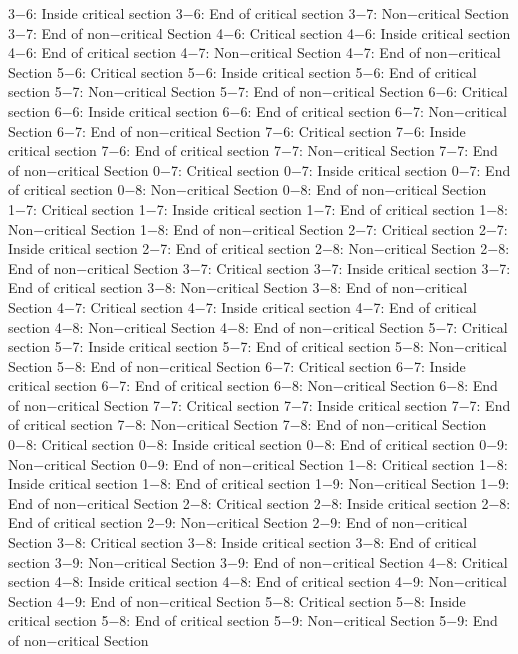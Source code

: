 3−6: Inside critical section
3−6: End of critical section
3−7: Non−critical Section
3−7: End of non−critical Section
4−6: Critical section
4−6: Inside critical section
4−6: End of critical section
4−7: Non−critical Section
4−7: End of non−critical Section
5−6: Critical section
5−6: Inside critical section
5−6: End of critical section
5−7: Non−critical Section
5−7: End of non−critical Section
6−6: Critical section
6−6: Inside critical section
6−6: End of critical section
6−7: Non−critical Section
6−7: End of non−critical Section
7−6: Critical section
7−6: Inside critical section
7−6: End of critical section
7−7: Non−critical Section
7−7: End of non−critical Section
0−7: Critical section
0−7: Inside critical section
0−7: End of critical section
0−8: Non−critical Section
0−8: End of non−critical Section
1−7: Critical section
1−7: Inside critical section
1−7: End of critical section
1−8: Non−critical Section
1−8: End of non−critical Section
2−7: Critical section
2−7: Inside critical section
2−7: End of critical section
2−8: Non−critical Section
2−8: End of non−critical Section
3−7: Critical section
3−7: Inside critical section
3−7: End of critical section
3−8: Non−critical Section
3−8: End of non−critical Section
4−7: Critical section
4−7: Inside critical section
4−7: End of critical section
4−8: Non−critical Section
4−8: End of non−critical Section
5−7: Critical section
5−7: Inside critical section
5−7: End of critical section
5−8: Non−critical Section
5−8: End of non−critical Section
6−7: Critical section
6−7: Inside critical section
6−7: End of critical section
6−8: Non−critical Section
6−8: End of non−critical Section
7−7: Critical section
7−7: Inside critical section
7−7: End of critical section
7−8: Non−critical Section
7−8: End of non−critical Section
0−8: Critical section
0−8: Inside critical section
0−8: End of critical section
0−9: Non−critical Section
0−9: End of non−critical Section
1−8: Critical section
1−8: Inside critical section
1−8: End of critical section
1−9: Non−critical Section
1−9: End of non−critical Section
2−8: Critical section
2−8: Inside critical section
2−8: End of critical section
2−9: Non−critical Section
2−9: End of non−critical Section
3−8: Critical section
3−8: Inside critical section
3−8: End of critical section
3−9: Non−critical Section
3−9: End of non−critical Section
4−8: Critical section
4−8: Inside critical section
4−8: End of critical section
4−9: Non−critical Section
4−9: End of non−critical Section
5−8: Critical section
5−8: Inside critical section
5−8: End of critical section
5−9: Non−critical Section
5−9: End of non−critical Section
